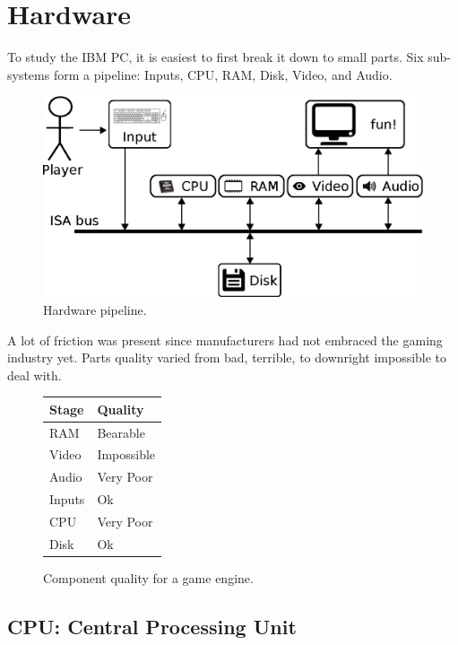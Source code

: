 \documentclass[book.tex]{subfiles}
\begin{document}
\chapter{Hardware}
\label{chapter_hardware}
To study the IBM PC, it is easiest to first break it down to small parts. Six sub-systems form a pipeline: Inputs, CPU, RAM, Disk, Video, and Audio.\\
\begin{figure}[H]
\centering
\includegraphics[width=\textwidth]{imgs/drawings/fun_pipeline.eps}
\caption{Hardware pipeline.}
\label{fig:digraph}
\end{figure}

A lot of friction was present since manufacturers had not embraced the gaming industry yet. Parts quality varied from  bad, terrible, to downright impossible to deal with.\\
\par

\begin{figure}[H]
\centering
\begin{tabularx}{\textwidth}{ X X  }
  \toprule
  \textbf{Stage} & \textbf{Quality} \\ \bottomrule
  RAM & Bearable \\ 
  Video & Impossible \\ 
  Audio & Very Poor \\ 
  Inputs & Ok \\ 
  CPU & Very Poor \\ 
  Disk & Ok \\ \bottomrule
\end{tabularx}
\caption{Component quality for a game engine.}
\end{figure}



\section{CPU: Central Processing Unit}
  
\end{document}
